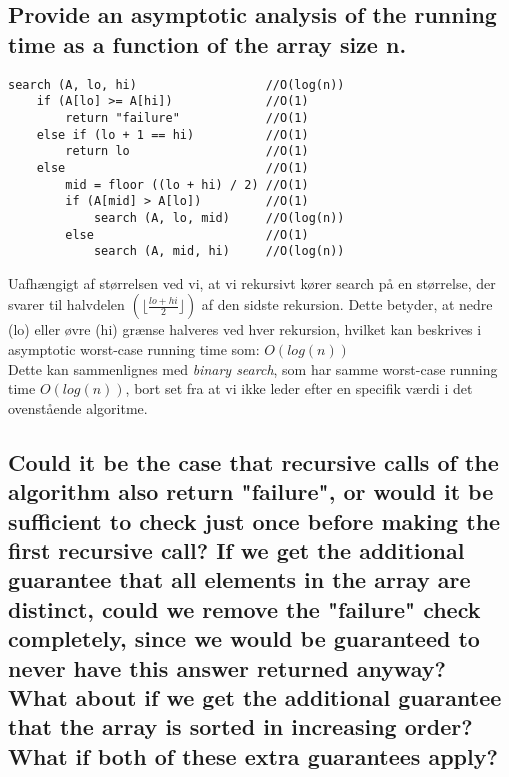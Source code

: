 \documentclass[a4paper,12pt]{article}
\begin{document}
\subsection[]{Provide an asymptotic analysis of the running time as a function of the array size n.}
    
\begin{lstlisting}
search (A, lo, hi)                  //O(log(n))
    if (A[lo] >= A[hi])             //O(1)
        return "failure"            //O(1)
    else if (lo + 1 == hi)          //O(1)
        return lo                   //O(1)
    else                            //O(1)
        mid = floor ((lo + hi) / 2) //O(1)
        if (A[mid] > A[lo])         //O(1)
            search (A, lo, mid)     //O(log(n))
        else                        //O(1)
            search (A, mid, hi)     //O(log(n))
\end{lstlisting}
Uafhængigt af størrelsen ved vi, at vi rekursivt kører search på en størrelse, der svarer til halvdelen $(\lfloor\frac{lo + hi}{2}\rfloor)$ af den sidste rekursion. Dette betyder, at nedre (lo) eller øvre (hi) grænse halveres ved hver rekursion, hvilket kan beskrives i asymptotic worst-case running time som: $O(log(n))$\\
Dette kan sammenlignes med \textit{binary search}, som har samme worst-case running time $O(log(n))$, bort set fra at vi ikke leder efter en specifik værdi i det ovenstående algoritme.

\subsection[]{Could it be the case that recursive calls of the algorithm also return "failure", or would it
be sufficient to check just once before making the first recursive call? If we get the additional
guarantee that all elements in the array are distinct, could we remove the "failure" check
completely, since we would be guaranteed to never have this answer returned anyway?
What about if we get the additional guarantee that the array is sorted in increasing order?
What if both of these extra guarantees apply?}
\end{document}
